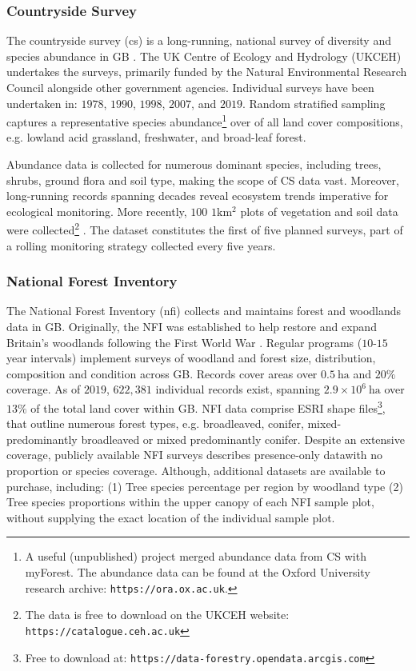 \subsubsection{Countryside Survey}

The countryside survey (\acrshort{cs}) is a long-running, national survey of diversity and species abundance in GB \cite{wood2017long}.
The UK Centre of Ecology and Hydrology (UKCEH) undertakes the surveys, primarily funded by the Natural Environmental Research Council alongside other government agencies.
Individual surveys have been undertaken in: $1978$, $1990$, $1998$, $2007$, and $2019$. 
Random stratified sampling captures a representative species abundance\footnote{
A useful (unpublished) project merged abundance data from CS with myForest. The abundance data can be found at the Oxford University research archive: \nolinkurl{https://ora.ox.ac.uk}.} 
over of all land cover compositions, e.g. lowland acid grassland, freshwater, and broad-leaf forest.

Abundance data is collected for numerous dominant species, including trees, shrubs, ground flora and soil type, 
making the scope of CS data vast. Moreover, long-running records spanning decades reveal ecosystem trends imperative for ecological monitoring.
More recently, $100$ $1\mathrm{km^2}$ plots of vegetation and soil data were collected\footnote{
The data is free to download on the UKCEH website: \nolinkurl{https://catalogue.ceh.ac.uk}} \cite{10.5285/fd6ae272-aeb5-4573-8e8a-7ccfae64f506}.
The dataset constitutes the first of five planned surveys, part of a rolling monitoring strategy collected every five years.

\subsubsection{National Forest Inventory}

The National Forest Inventory (\acrshort{nfi}) collects and maintains forest and woodlands data in GB.
Originally, the NFI was established to help restore and expand Britain's woodlands following the First World War \cite{james1990history}.
Regular programs ($10$-$15$ year intervals) implement surveys of woodland and forest size, distribution, composition and condition across GB.
Records cover areas over $0.5\ \mathrm{ha}$ and $20\%$ coverage.
As of $2019$, $622,381$ individual records exist, spanning $2.9 \times 10^6\ \mathrm{ha}$ over $13\%$ of the total land cover within GB.
NFI data comprise ESRI shape files\footnote{
Free to download at: \nolinkurl{https://data-forestry.opendata.arcgis.com}},
that outline numerous forest types, e.g. broadleaved, conifer, mixed-predominantly broadleaved or mixed predominantly conifer.
Despite an extensive coverage, publicly available NFI surveys describes presence-only data\textemdash with no proportion or species coverage.
Although, additional datasets are available to purchase, including: 
(1) Tree species percentage per region by woodland type
(2) Tree species proportions within the upper canopy of each NFI sample plot, without supplying the exact location of the individual sample plot.

